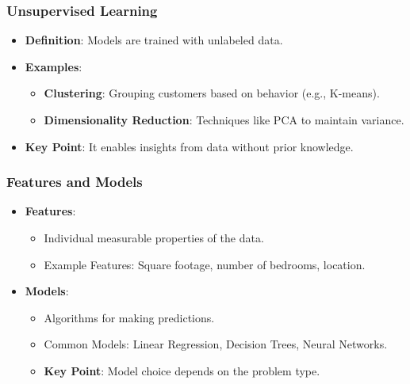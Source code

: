 \documentclass[aspectratio=169]{beamer}
\begin{document}
\begin{frame}[fragile]
    \frametitle{Unsupervised Learning}
    \begin{itemize}
        \item \textbf{Definition}: 
            Models are trained with unlabeled data.
        \item \textbf{Examples}: 
            \begin{itemize}
                \item \textbf{Clustering}: Grouping customers based on behavior (e.g., K-means).
                \item \textbf{Dimensionality Reduction}: Techniques like PCA to maintain variance.
            \end{itemize}
        \item \textbf{Key Point}: 
            It enables insights from data without prior knowledge.
    \end{itemize}
\end{frame}

\begin{frame}[fragile]
    \frametitle{Features and Models}
    \begin{itemize}
        \item \textbf{Features}:
            \begin{itemize}
                \item Individual measurable properties of the data.
                \item Example Features: Square footage, number of bedrooms, location.
            \end{itemize}
        \item \textbf{Models}:
            \begin{itemize}
                \item Algorithms for making predictions.
                \item Common Models: Linear Regression, Decision Trees, Neural Networks.
                \item \textbf{Key Point}: Model choice depends on the problem type.
            \end{itemize}
    \end{itemize}
\end{frame}
\end{document}
